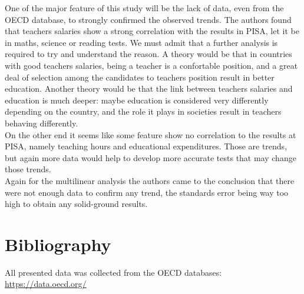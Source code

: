 \documentclass[12pt,a4paper]{article}
\begin{document}
One of the major feature of this study will be the lack of data, even from the OECD database, to strongly confirmed the observed trends.
The authors found that teachers salaries show a strong correlation with the results in PISA, let it be in maths, science or reading tests. We must admit that a further analysis is required to try and understand the reason. A theory would be that in countries with good teachers salaries, being a teacher is a confortable position, and a great deal of selection among the candidates to teachers position result in better education. Another theory would be that the link between teachers salaries and education is much deeper: maybe education is considered very differently depending on the country, and the role it plays in societies result in teachers behaving differently.
\\
On the other end it seems like some feature show no correlation to the results at PISA, namely teaching hours and educational expenditures. Those are trends, but again more data would help to develop more accurate tests that may change those trends.
\\
Again for the multilinear analysis the authors came to the conclusion that there were not enough data to confirm any trend, the standards error being way too high to obtain any solid-ground results.

\section{Bibliography}

All presented data was collected from the OECD databases:
\url{https://data.oecd.org/}

\end{document}

